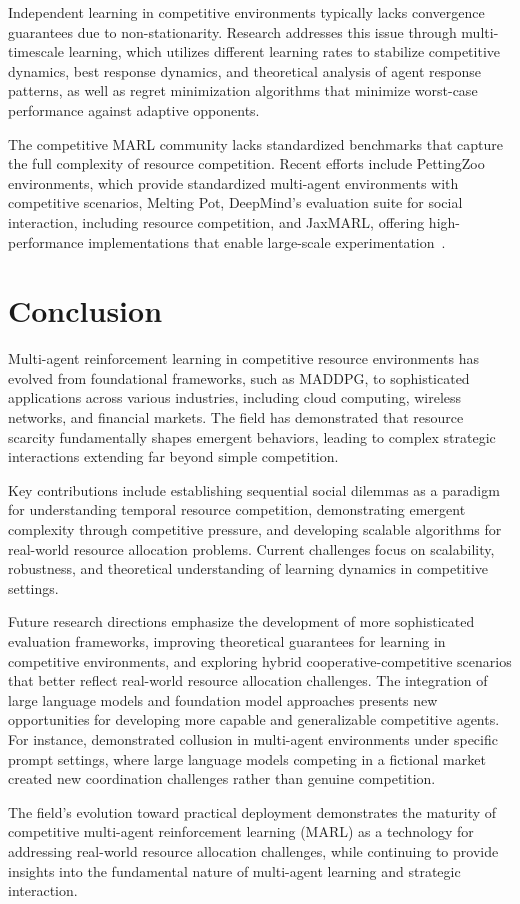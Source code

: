 Independent learning in competitive environments typically lacks convergence guarantees due to non-stationarity. Research addresses this issue through multi-timescale learning, which utilizes different learning rates to stabilize competitive dynamics, best response dynamics, and theoretical analysis of agent response patterns, as well as regret minimization algorithms that minimize worst-case performance against adaptive opponents.

The competitive MARL community lacks standardized benchmarks that capture the full complexity of resource competition. Recent efforts include PettingZoo environments, which provide standardized multi-agent environments with competitive scenarios, Melting Pot, DeepMind's evaluation suite for social interaction, including resource competition, and JaxMARL, offering high-performance implementations that enable large-scale experimentation~\autocite{liu_scaling_2024}.

\section{Conclusion}

Multi-agent reinforcement learning in competitive resource environments has evolved from foundational frameworks, such as MADDPG, to sophisticated applications across various industries, including cloud computing, wireless networks, and financial markets. The field has demonstrated that resource scarcity fundamentally shapes emergent behaviors, leading to complex strategic interactions extending far beyond simple competition.

Key contributions include establishing sequential social dilemmas as a paradigm for understanding temporal resource competition, demonstrating emergent complexity through competitive pressure, and developing scalable algorithms for real-world resource allocation problems. Current challenges focus on scalability, robustness, and theoretical understanding of learning dynamics in competitive settings.

Future research directions emphasize the development of more sophisticated evaluation frameworks, improving theoretical guarantees for learning in competitive environments, and exploring hybrid cooperative-competitive scenarios that better reflect real-world resource allocation challenges. The integration of large language models and foundation model approaches presents new opportunities for developing more capable and generalizable competitive agents. For instance, \textcite{fish_algorithmic_2025} demonstrated collusion in multi-agent environments under specific prompt settings, where large language models competing in a fictional market created new coordination challenges rather than genuine competition.

The field's evolution toward practical deployment demonstrates the maturity of competitive multi-agent reinforcement learning (MARL) as a technology for addressing real-world resource allocation challenges, while continuing to provide insights into the fundamental nature of multi-agent learning and strategic interaction.